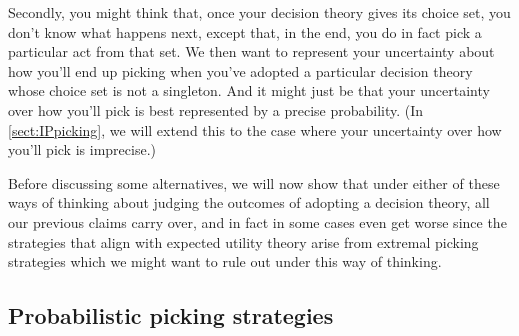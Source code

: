 \documentclass[a4paper,final]{article}
\newcommand\Exp{\mathsf{Exp}}
\newcommand\U{\mathfrak{U}} %
\newcommand{\n}{\mathsf{n}}
\newcommand{\todoold}[2][]{\todo[backgroundcolor=white,bordercolor=orange!10,linecolor=gray!10, #1,caption={},textcolor=gray]{Pre-rev: #2}}
\newenvironment{CCM rewritten}
{\begingroup\color{blue}} %
{\endgroup}              %
\begin{document}
Secondly, you might think that, once your decision theory gives its choice set, you don't know what happens next, except that, in the end, you do in fact pick a particular act from that set. We then want to represent your uncertainty about how you'll end up picking when you've adopted a particular decision theory whose choice set is not a singleton. And it might just be that your uncertainty over how you'll pick is best represented by a precise probability. (In \cref{sect:IPpicking}, we will extend this to the case where your uncertainty over how you'll pick is imprecise.)



Before discussing some alternatives, we will now show that under either of these ways of thinking about judging the outcomes of adopting a decision theory, all our previous claims carry over, and in fact in some cases even get worse since the strategies that align with expected utility theory arise from extremal picking strategies which we might want to rule out under this way of thinking. 






\subsection{Probabilistic picking strategies}
\end{document}

